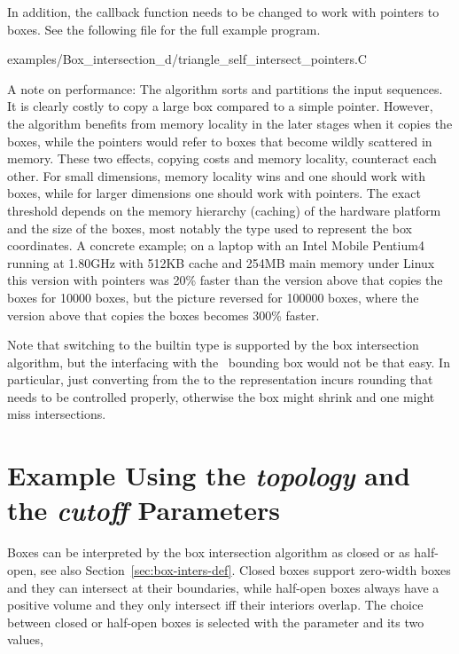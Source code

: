 In addition, the callback function  needs to be
changed to work with pointers to boxes. See the following file for the
full example program.

\begin{ccExampleCode}
    examples/Box_intersection_d/triangle_self_intersect_pointers.C
\end{ccExampleCode}

A note on performance: The algorithm sorts and partitions the input
sequences. It is clearly costly to copy a large box compared to a
simple pointer. However, the algorithm benefits from memory locality
in the later stages when it copies the boxes, while the pointers would
refer to boxes that become wildly scattered in memory.  These two
effects, copying costs and memory locality, counteract each other. For
small dimensions, memory locality wins and one should work with boxes,
while for larger dimensions one should work with pointers. The exact
threshold depends on the memory hierarchy (caching) of the hardware
platform and the size of the boxes, most notably the type used to
represent the box coordinates. A concrete example; on a laptop with an
Intel Mobile Pentium4 running at 1.80GHz with 512KB cache and 254MB
main memory under Linux this version with pointers was 20\%
faster than the version above that copies the boxes for 10000 boxes,
but the picture reversed for 100000 boxes, where the version above
that copies the boxes becomes 300\% faster.

Note that switching to the builtin type  is supported by
the box intersection algorithm, but the interfacing with the \cgal\ 
bounding box  would not be that easy. In particular,
just converting from the \ccc{double} to the \ccc{float}
representation incurs rounding that needs to be controlled properly,
otherwise the box might shrink and one might miss intersections.


\section{Example Using the \textit{topology} and the \textit{cutoff} 
Parameters}\label{sec:box-inters-params}

Boxes can be interpreted by the box intersection algorithm as closed
or as half-open, see also Section~\ref{sec:box-inters-def}.  Closed
boxes support zero-width boxes and they can intersect at their
boundaries, while half-open boxes always have a positive volume and
they only intersect iff their interiors overlap.  The choice between
closed or half-open boxes is selected with the \ccc{topology}
parameter and its two values,

